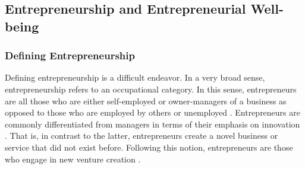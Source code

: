 \documentclass[a4paper,man,noextraspace,natbib]{apa6}
\begin{document}
\subsection{Entrepreneurship and Entrepreneurial Well-being}

\subsubsection{Defining Entrepreneurship}

Defining entrepreneurship is a difficult endeavor. In a very broad sense, entrepreneurship refers to an occupational category. 
In this sense, entrepreneurs are all those who are either self-employed or owner-managers of a business as opposed to those who are employed by others or unemployed \citep{Gorgievski2016a, VanPraag2007}. 
Entrepreneurs are commonly differentiated from managers in terms of their emphasis on innovation \cite[e.g.][]{Drucker2014}. 
That is, in contrast to the latter, entrepreneurs create a novel business or service that did not exist before. Following this notion, entrepreneurs are those who engage in new venture creation \citep{Shane2000}. \par
\end{document}
